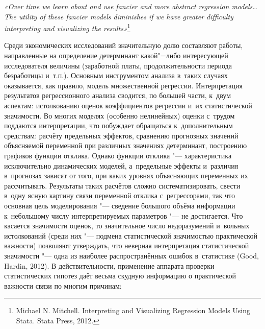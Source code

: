 \documentclass[11pt]{article}
\begin{document}
\setcounter{page}{15}



\DoFirstPageTechnicalStuff

\begin{abstract}

\end{abstract}

\begin{keyword}

\end{keyword}



{\it «Over time we learn about and use fancier and more abstract regression models… The utility of these fancier models diminishes if we have greater difficulty interpreting and visualizing the results»}\footnote{Michael N. Mitchell. Interpreting and Visualizing Regression Models Using Stata. Stata Press, 2012.}

\bigskip
Среди экономических исследований значительную долю составляют работы, направленные на определение детерминант какой"=либо интересующей исследователя величины (заработной платы, продолжительности периода безработицы и~т.п.). Основным инструментом анализа в~таких случаях оказывается, как правило, модель множественной регрессии. Интерпретация результатов регрессионного анализа сводится, по большей части, к~двум аспектам: истолкованию оценок коэффициентов регрессии и~их статистической значимости. Во многих моделях (особенно нелинейных) оценки с~трудом поддаются интерпретации, что побуждает обращаться к~дополнительным средствам: расчёту предельных эффектов, сравнению прогнозных значений объясняемой переменной при различных значениях детерминант, построению графиков функции отклика. Однако функции отклика "--- характеристика исключительно динамических моделей, а~предельные эффекты и~различия в~прогнозах зависят от того, при каких уровнях объясняющих переменных их рассчитывать. Результаты таких расчётов сложно систематизировать, свести в~одну ясную картину связи переменной отклика с~регрессорами, так что основная цель моделирования "--- сведение большого объёма информации к~небольшому числу интерпретируемых параметров "--- не достигается. Что касается значимости оценок, то значительное число недоразумений и~вольных истолкований (среди них "--- подмена статистической значимостью практической важности) позволяют утверждать, что неверная интерпретация статистической значимости "--- одна из наиболее распространённых ошибок в~статистике (Good, Hardin, 2012). В действительности, применение аппарата проверки статистических гипотез даёт весьма скудную информацию о практической важности связи по многим причинам:
\end{document}
